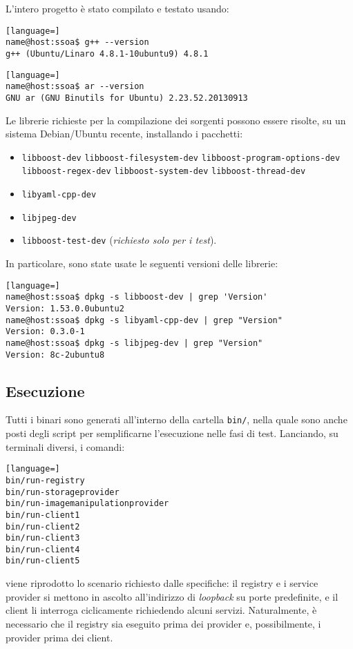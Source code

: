 \documentclass[a4paper,twoside]{article}
\newcommand*\file{\texttt}
\begin{document}
L'intero progetto è stato compilato e testato usando:
\begin{lstlisting}[language=]
name@host:ssoa$ g++ --version 
g++ (Ubuntu/Linaro 4.8.1-10ubuntu9) 4.8.1
\end{lstlisting}

\begin{lstlisting}[language=]
name@host:ssoa$ ar --version 
GNU ar (GNU Binutils for Ubuntu) 2.23.52.20130913
\end{lstlisting}

Le librerie richieste per la compilazione dei sorgenti possono essere risolte, su un sistema Debian/Ubuntu recente, installando i pacchetti:
\begin{itemize}
\item \file{libboost-dev} \file{libboost-filesystem-dev} \file{libboost-program-options-dev} \file{libboost-regex-dev} \file{libboost-system-dev} \file{libboost-thread-dev}
\item \file{libyaml-cpp-dev}
\item \file{libjpeg-dev}
\item \file{libboost-test-dev} (\emph{richiesto solo per i test}).
\end{itemize}

In particolare, sono state usate le seguenti versioni delle librerie:
\begin{lstlisting}[language=]
name@host:ssoa$ dpkg -s libboost-dev | grep 'Version'
Version: 1.53.0.0ubuntu2
name@host:ssoa$ dpkg -s libyaml-cpp-dev | grep "Version"
Version: 0.3.0-1
name@host:ssoa$ dpkg -s libjpeg-dev | grep "Version"
Version: 8c-2ubuntu8
\end{lstlisting}



\subsection{Esecuzione}

Tutti i binari sono generati all'interno della cartella \file{bin/}, nella quale sono anche posti degli script per semplificarne l'esecuzione nelle fasi di test. Lanciando, su terminali diversi, i comandi:
\begin{lstlisting}[language=]
bin/run-registry
bin/run-storageprovider
bin/run-imagemanipulationprovider
bin/run-client1
bin/run-client2
bin/run-client3
bin/run-client4
bin/run-client5
\end{lstlisting}
viene riprodotto lo scenario richiesto dalle specifiche: il registry e i service provider si mettono in ascolto all'indirizzo di \emph{loopback} su porte predefinite, e il client li interroga ciclicamente richiedendo alcuni servizi. Naturalmente, è necessario che il registry sia eseguito prima dei provider e, possibilmente, i provider prima dei client.
\end{document}
